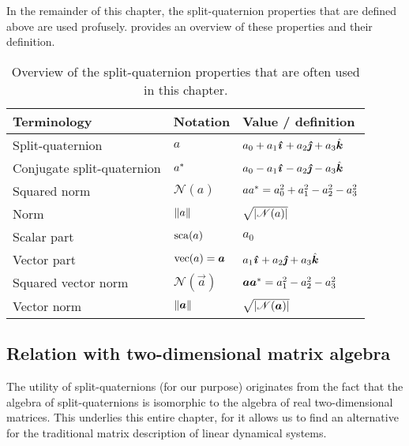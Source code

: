 In the remainder of this chapter, the split-quaternion properties that are defined above are used profusely.  provides an overview of these properties and their definition. 

\renewcommand{\arraystretch}{1.2}
\begin{table}[ht]
    \centering
    \caption{Overview of the split-quaternion properties that are often used in this chapter.}
    \label{tab:spquat_properties}
    \begin{tabular}{lll}
        \toprule
        \textbf{Terminology} & \textbf{Notation} & \textbf{Value / definition} \\
        \midrule
        Split-quaternion & $a$ & $a_0 + a_1\quati + a_2\quatj + a_3\quatk$ \\
        Conjugate split-quaternion & $a^*$ & $a_0 - a_1\quati - a_2\quatj - a_3\quatk$\\
        \midrule
        Squared norm & $\mathscr{N}(a)$ & $aa^* = a_0^2 + a_1^2 - a_2^2 - a_3^2$ \\
        Norm & $\norm{a}$ & $\sqrt{\abs{\mathscr{N}(a)}}$ \\
        \midrule
        Scalar part & $\mathrm{sca}\qty(a)$ & $a_0$ \\
        Vector part & $\vecpart{a} = \vec{a}$ & $a_1\quati + a_2\quatj + a_3\quatk$ \\
        \midrule
        Squared vector norm & $\mathscr{N}(\vec{a})$ & $ \vec{a}\conj{\vec{a}} = a_1^2 - a_2^2 - a_3^2 $ \\
        Vector norm & $\norm{\vec{a}}$ & $\sqrt{\abs{\mathscr{N}(\vec{a})}}$ \\
        \bottomrule
    \end{tabular}
\end{table}
\renewcommand{\arraystretch}{1}
 
\subsection{Relation with two-dimensional matrix algebra}
\label{ssec:quat_isomorphism}
The utility of split-quaternions (for our purpose) originates from the fact that the algebra of split-quaternions is isomorphic to the algebra of real two-dimensional matrices. This underlies this entire chapter, for it allows us to find an alternative for the traditional matrix description of linear dynamical systems. 

